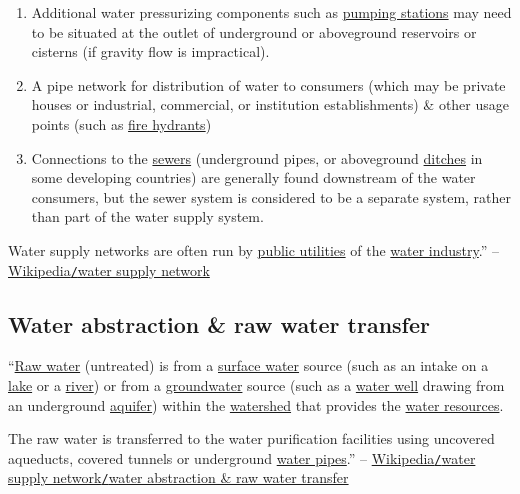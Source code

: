 \documentclass[oneside]{book}
\numberwithin{equation}{section}
\begin{document}
\begin{enumerate}
	\item Additional water pressurizing components such as \href{https://en.wikipedia.org/wiki/Pumping_station}{pumping stations} may need to be situated at the outlet of underground or aboveground reservoirs or cisterns (if gravity flow is impractical).
	\item A pipe network for distribution of water to consumers (which may be private houses or industrial, commercial, or institution establishments) \& other usage points (such as \href{https://en.wikipedia.org/wiki/Fire_hydrant}{fire hydrants})
	\item Connections to the \href{https://en.wikipedia.org/wiki/Sanitary_sewer}{sewers} (underground pipes, or aboveground \href{https://en.wikipedia.org/wiki/Ditch}{ditches} in some developing countries) are generally found downstream of the water consumers, but the sewer system is considered to be a separate system, rather than part of the water supply system.
\end{enumerate}
Water supply networks are often run by \href{https://en.wikipedia.org/wiki/Public_utility}{public utilities} of the \href{https://en.wikipedia.org/wiki/Water_industry}{water industry}.'' -- \href{https://en.wikipedia.org/wiki/Water_supply_network}{Wikipedia\texttt{/}water supply network}

\subsection{Water abstraction \& raw water transfer}
``\href{https://en.wikipedia.org/wiki/Raw_water}{Raw water} (untreated) is from a \href{https://en.wikipedia.org/wiki/Surface_water}{surface water} source (such as an intake on a \href{https://en.wikipedia.org/wiki/Lake}{lake} or a \href{https://en.wikipedia.org/wiki/River}{river}) or from a \href{https://en.wikipedia.org/wiki/Groundwater}{groundwater} source (such as a \href{https://en.wikipedia.org/wiki/Water_well}{water well} drawing from an underground \href{https://en.wikipedia.org/wiki/Aquifer}{aquifer}) within the \href{https://en.wikipedia.org/wiki/Drainage_basin}{watershed} that provides the \href{https://en.wikipedia.org/wiki/Water_resource}{water resources}.

The raw water is transferred to the water purification facilities using uncovered aqueducts, covered tunnels or underground \href{https://en.wikipedia.org/wiki/Water_pipes}{water pipes}.'' -- \href{https://en.wikipedia.org/wiki/Water_supply_network#Water_abstraction_and_raw_water_transfer}{Wikipedia\texttt{/}water supply network\texttt{/}water abstraction \& raw water transfer}
\end{document}
